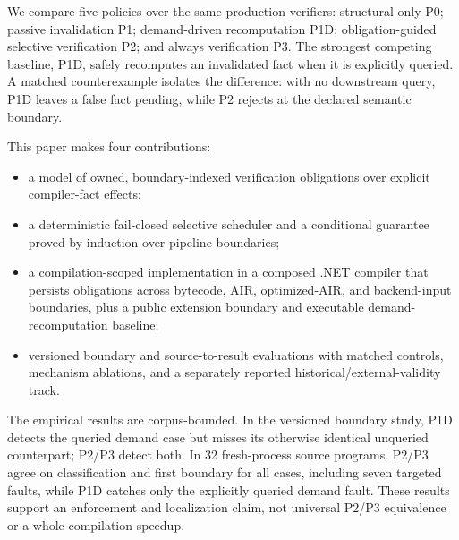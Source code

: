 We compare five policies over the same production verifiers: structural-only P0; passive invalidation P1; demand-driven recomputation P1D; obligation-guided selective verification P2; and always verification P3. The strongest competing baseline, P1D, safely recomputes an invalidated fact when it is explicitly queried. A matched counterexample isolates the difference: with no downstream query, P1D leaves a false fact pending, while P2 rejects at the declared semantic boundary.

This paper makes four contributions:
\begin{itemize}
  \item a model of owned, boundary-indexed verification obligations over explicit compiler-fact effects;
  \item a deterministic fail-closed selective scheduler and a conditional guarantee proved by induction over pipeline boundaries;
  \item a compilation-scoped implementation in a composed .NET compiler that persists obligations across bytecode, AIR, optimized-AIR, and backend-input boundaries, plus a public extension boundary and executable demand-recomputation baseline;
  \item versioned boundary and source-to-result evaluations with matched controls, mechanism ablations, and a separately reported historical/external-validity track.
\end{itemize}

The empirical results are corpus-bounded. In the versioned boundary study, P1D detects the queried demand case but misses its otherwise identical unqueried counterpart; P2/P3 detect both. In 32 fresh-process source programs, P2/P3 agree on classification and first boundary for all cases, including seven targeted faults, while P1D catches only the explicitly queried demand fault. These results support an enforcement and localization claim, not universal P2/P3 equivalence or a whole-compilation speedup.
